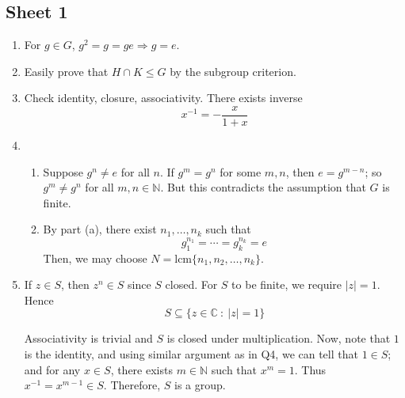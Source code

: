 \documentclass[10pt, a4paper, twoside]{report}
\begin{document}
\subsection{Sheet 1}
\begin{enumerate}[{1.}]
    \item For \(g\in G\), \(g^2=g=ge\Rightarrow g=e\).
    \item Easily prove that \(H\cap K\leq G\) by the subgroup criterion.
    \item Check identity, closure, associativity. There exists inverse 
    \[x^{-1}=-\frac{x}{1+x}\]
    \item \begin{enumerate} [{(a)}]
        \item Suppose \(g^n\neq e\) for all \(n\). If \(g^m=g^n\) for some \(m,n\), then \(e=g^{m-n}\); so \(g^m\neq g^n\) for all \(m,n\in\mathbb{N}\). But this contradicts the assumption that \(G\) is finite. 
        \item By part (a), there exist \(n_1,\ldots,n_k\) such that 
        \[g_1^{n_1}=\cdots=g_k^{n_k}=e\]
        Then, we may choose \(N=\text{lcm}\{n_1,n_2,\ldots,n_k\}\).
    \end{enumerate}
    \item If \(z\in S\), then \(z^n\in S\) since \(S\) closed. For \(S\) to be finite, we require \(|z|=1\). Hence 
    \[S\subseteq\{z\in\mathbb{C}\::\:|z|=1\}\]
    
    Associativity is trivial and \(S\) is closed under multiplication. Now, note that \(1\) is the identity, and using similar argument as in Q4, we can tell that \(1\in S\); and for any \(x\in S\), there exists \(m\in\mathbb{N}\) such that \(x^m=1\). Thus \(x^{-1}=x^{m-1}\in S\). Therefore, \(S\) is a group.


\end{enumerate}
\end{document}
